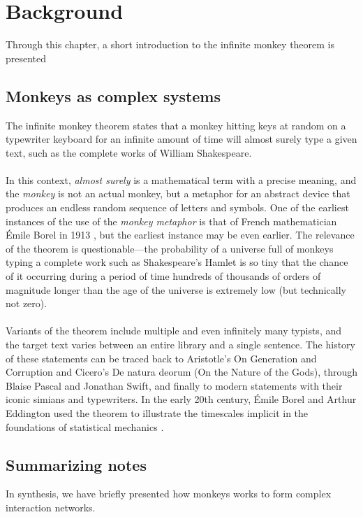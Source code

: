 \chapter{Background} \label{background}

Through this chapter, a short 
introduction to the infinite monkey theorem is presented

\section{Monkeys as complex systems}

The infinite monkey theorem states that a monkey hitting keys at random on a typewriter keyboard for an infinite amount of time will almost surely type a given text, such as the complete works of William Shakespeare.
\\
\\
In this context, \textit{almost surely} is a mathematical term with a precise meaning, and the \textit{monkey} is not an actual monkey, but a metaphor for an abstract device that produces an endless random sequence of letters and symbols. One of the earliest instances of the use of the \textit{monkey metaphor} is that of French mathematician Émile Borel in 1913 \cite{borel1913mecanique}, but the earliest instance may be even earlier. The relevance of the theorem is questionable—the probability of a universe full of monkeys typing a complete work such as Shakespeare's Hamlet is so tiny that the chance of it occurring during a period of time hundreds of thousands of orders of magnitude longer than the age of the universe is extremely low (but technically not zero).
\\
\\
Variants of the theorem include multiple and even infinitely many typists, and the target text varies between an entire library and a single sentence. The history of these statements can be traced back to Aristotle's On Generation and Corruption and Cicero's De natura deorum (On the Nature of the Gods), through Blaise Pascal and Jonathan Swift, and finally to modern statements with their iconic simians and typewriters. In the early 20th century, Émile Borel and Arthur Eddington used the theorem to illustrate the timescales implicit in the foundations of statistical mechanics \cite{wikiMonkeys}.

\section{Summarizing notes} 

In synthesis, we have briefly presented how monkeys  
works to form complex interaction networks. 


